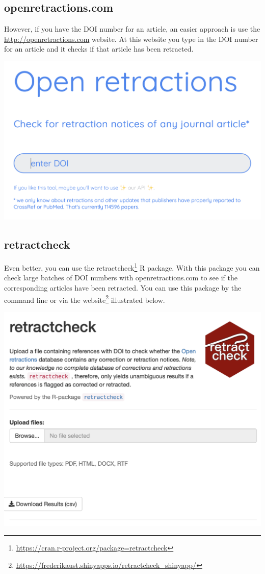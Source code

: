 \documentclass[
]{krantz}
\renewcommand{\href}[2]{#2\footnote{\url{#1}}}
\begin{document}
\hypertarget{openretractions.com}{%
\subsection{openretractions.com}\label{openretractions.com}}

However, if you have the DOI number for an article, an easier approach is use the \url{http://openretractions.com} website. At this website you type in the DOI number for an article and it checks if that article has been retracted.

\includegraphics[width=0.6\linewidth]{ch_tools/images/openretractions}

\hypertarget{retractcheck}{%
\subsection{retractcheck}\label{retractcheck}}

Even better, you can use the \href{https://cran.r-project.org/package=retractcheck}{retractcheck} R package. With this package you can check large batches of DOI numbers with openretractions.com to see if the corresponding articles have been retracted. You can use this package by the command line or via the \href{https://frederikaust.shinyapps.io/retractcheck_shinyapp/}{website} illustrated below.

\includegraphics[width=0.6\linewidth]{ch_tools/images/retractcheck_website}
\end{document}
